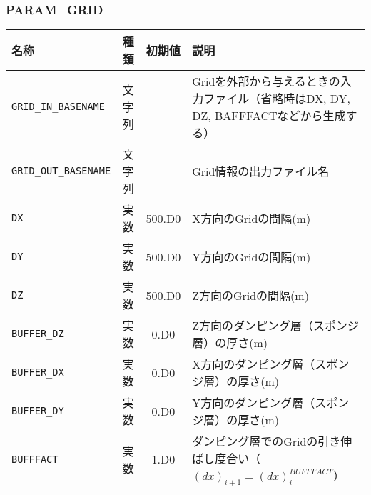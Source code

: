 \subsubsection{PARAM\_GRID}
\begin{tabularx}{150mm}{|l|c|c|X|} \hline
 \rowcolor[gray]{0.9} 名称 & 種類 & 初期値 & 説明 \\ \hline
 \verb|GRID_IN_BASENAME| & 文字列 &  & Gridを外部から与えるときの入力ファイル（省略時はDX, DY, DZ, BAFFFACTなどから生成する） \\ \hline
 \verb|GRID_OUT_BASENAME| & 文字列 &  & Grid情報の出力ファイル名 \\ \hline
 \verb|DX| & 実数 & 500.D0 & X方向のGridの間隔(m) \\ \hline
 \verb|DY| & 実数 & 500.D0 & Y方向のGridの間隔(m) \\ \hline
 \verb|DZ| & 実数 & 500.D0 & Z方向のGridの間隔(m) \\ \hline
 \verb|BUFFER_DZ| & 実数 & 0.D0 & Z方向のダンピング層（スポンジ層）の厚さ(m) \\ \hline
 \verb|BUFFER_DX| & 実数 & 0.D0 & X方向のダンピング層（スポンジ層）の厚さ(m) \\ \hline
 \verb|BUFFER_DY| & 実数 & 0.D0 & Y方向のダンピング層（スポンジ層）の厚さ(m) \\ \hline
 \verb|BUFFFACT| & 実数 & 1.D0 & ダンピング層でのGridの引き伸ばし度合い（$(dx)_{i+1}=(dx)^{BUFFFACT}_{i}$） \\ \hline
\end{tabularx}


